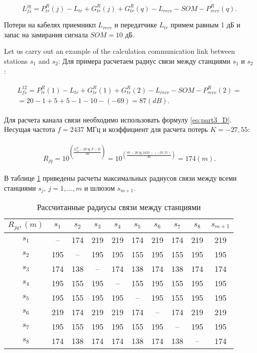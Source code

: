 \begin{displaymath}
  L_{fs}^{jq} = P_{tr}^R(j) - L_{tr} + G_{tr}^R(j) + G_{tr}^R(q) - L_{recv} - SOM - P_{recv}^R(q).
\end{displaymath}


Потери на кабелях приемникп $ L_{recv} $ и передатчике $ L_{tr} $ примем равным 1 дБ и запас на замирания сигнала $ SOM = 10 $ дБ.

Let us carry out an example of the calculation communication link between stations $ s_1 $ and $ s_2 $:
Для примера расчетаем радиус связи между станциями $ s_1 $ и $ s_2 $:

\begin{align}
  \begin{aligned}
  L_{fs}^{12} = P_{tr}^R(1) - L_{tr} + G_{tr}^R(1) + G_{tr}^R(2) - L_{recv} - SOM - P_{recv}^R(2)= \\
  = 20 - 1 + 5 + 5 - 1 - 10 - (-69) = 87 (dB).
  \end{aligned}
\end{align}

Для расчета канала связи необходимо использовать формулу \cref{eq:part3_D}. Несущая частота $ f = 2437 $ МГц и коэффициент для расчета потерь $ K = -27,55 $:

\begin{align}
  \begin{aligned}
  R_{jq} = 10^{\left(\frac{L_{fs}^{jq} - 20\lg{F} - K}{20}\right)}
  = 10^{\left(\frac{87 - 20\lg{2437} - (-27.55)}{20}\right)} = 174 (m).
  \end{aligned}
\end{align}

В таблице \cref{tab:part3_Rjq} приведены расчеты максимальных радиусов связи между всеми станциями $ s_j $, $ j = 1, ..., m $ и шлюзом $ s_ {m + 1} $.

\begin{table}[h!]\centering
  \begin{tabular}{|c||c|c|c|c|c|c|c|c|c|}\hline
      $R_{jq}, (m)$ & $s_1$ & $s_2$ & $s_3$ & $s_4$ & $s_5$ & $s_6$ & $s_7$ & $s_8$ & $s_{m+1}$ \\ \hline \hline

      $s_1$ &--& 174& 219& 219& 174& 219& 174& 219& 219\\ 
      $s_2$ &195& --& 195& 195& 155& 195& 155& 195& 195\\ 
      $s_3$ &174& 138& --& 174& 138& 174& 138& 174& 174\\ 
      $s_4$ &195& 155& 195& --& 155& 195& 155& 195& 195\\ 
      $s_5$ &195& 155& 195& 195& --& 195& 155& 195& 195\\ 
      $s_6$ &219& 174& 219& 219& 174& --& 174& 219& 219\\
      $s_7$ &195& 155& 195& 195& 155& 195& --& 195& 195\\ 
      $s_8$ &174& 138& 174& 174& 138& 174& 138& --& 174\\ 
      \hline

\end{tabular}\caption{Рассчитанные радиусы связи между станциями}\label{tab:part3_Rjq}
\end{table}

